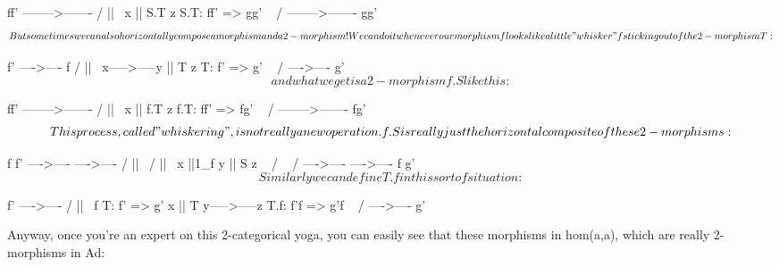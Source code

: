                          ff'
                  -------->-------
                 /       ||       \
                x        || S.T    z                S.T: ff' => gg'
                 \       \/       /
                  -------->-------
                         gg'
$$
    
But sometimes we can also horizontally compose a morphism and a
2-morphism!  We can do it whenever our morphism f looks like a little
"whisker" f sticking out of the 2-morphism T:


$$

                                  f'
                              ---->----  
                      f      /   ||    \              
                x----->-----y    || T   z             T: f' => g'
                             \   \/    /
                              ---->----
                                  g'
$$
    
and what we get is a 2-morphism f.S like this:
 


$$

                         ff'
                  -------->-------
                 /       ||       \
                x        || f.T    z                f.T: ff' => fg'
                 \       \/       /
                  -------->-------
                         fg'
$$
    
This process, called "whiskering", is not really a new operation.
f.S is really just the horizontal composite of these 2-morphisms:


$$

                      f           f'
                  ---->----   ---->----  
                 /   ||    \ /   ||    \              
                x    ||1_f  y    || S   z             
                 \   \/    / \   \/    /
                  ---->----   ---->----
                      f           g'
$$
    
Similarly we can define T.f in this sort of situation:


$$

                      f'           
                  ---->----   
                 /   ||    \      f                   T: f' => g'
                x    || T   y----->-----z             T.f: f'f => g'f
                 \   \/    /
                  ---->---- 
                      g'     
$$
    
Anyway, once you're an expert on this 2-categorical yoga, you can
easily see that these morphisms in hom(a,a), which are really 2-morphisms
in Ad:


